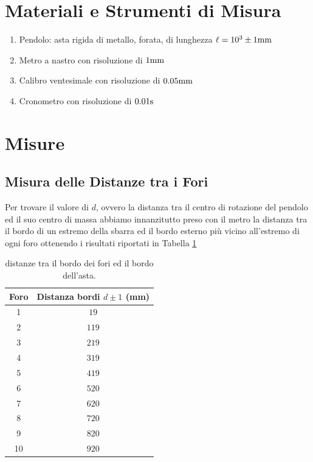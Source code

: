\documentclass[a4paper,12pt]{article}
\begin{document}
\section{Materiali e Strumenti di Misura}

\begin{enumerate}
    \item Pendolo: asta rigida di metallo, forata, di lunghezza $\ell = 10^3 \pm 1 \rm mm$
    \item Metro a nastro con risoluzione di $1\rm mm$
    \item Calibro ventesimale con risoluzione di $0.05\rm mm$
    \item Cronometro con risoluzione di $ 0.01 \rm s$ %
\end{enumerate}

\section{Misure}

\subsection{Misura delle Distanze tra i Fori}  
Per trovare il valore di $d$, ovvero la distanza tra il centro di rotazione del pendolo ed il suo centro di massa abbiamo innanzitutto preso con il metro la distanza tra il bordo di un estremo della sbarra ed il bordo esterno più vicino all'estremo di ogni foro ottenendo i risultati riportati in Tabella \ref{misure bordo bordo}\\ %


\begin{table}[h!]
\centering
\begin{tabular}{c|c}
     \toprule
     Foro  & Distanza bordi $d\pm1$ (mm) \\
     \midrule
    1 &$19$\\
    2 & $119$\\
    3 & $219$\\
    4 & $319$\\
    5 & $419$\\
    6 & $520$\\
    7 & $620$\\
    8 & $720$\\
    9 & $820$\\
    10 & $920$\\
     \bottomrule
  \end{tabular}
  \caption{distanze tra il bordo dei fori ed il bordo dell'asta.}\label{misure bordo bordo}
\end{table}
\end{document}
